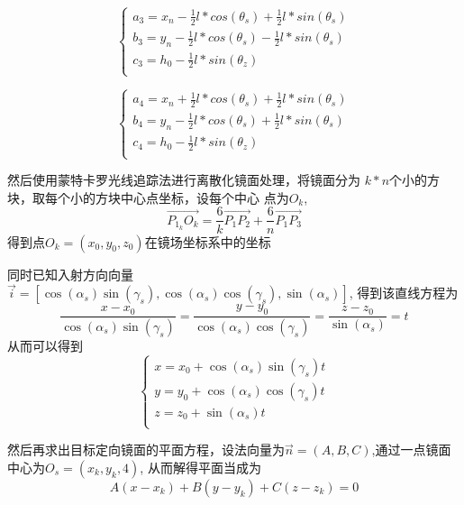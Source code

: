 \documentclass{数学建模}
\begin{document}
\begin{equation}
    \begin{cases}
        a_3 = x_n - \frac{1}{2}l*cos(\theta_s) +  \frac{1}{2}l*sin(\theta_s) \\
        b_3 = y_n - \frac{1}{2}l*cos(\theta_s) -  \frac{1}{2}l*sin(\theta_s) \\
        c_3 = h_0 - \frac{1}{2}l*sin(\theta_z)  \\
    \end{cases}
\end{equation}

\begin{equation}
    \begin{cases}
        a_4 = x_n + \frac{1}{2}l*cos(\theta_s) +  \frac{1}{2}l*sin(\theta_s) \\
        b_4 = y_n - \frac{1}{2}l*cos(\theta_s) +  \frac{1}{2}l*sin(\theta_s) \\
        c_4 = h_0 - \frac{1}{2}l*sin(\theta_z)  \\
    \end{cases}
\end{equation}

然后使用蒙特卡罗光线追踪法进行离散化镜面处理，将镜面分为
$k*n$个小的方块，取每个小的方块中心点坐标，设每个中心
点为$O_k$,
\begin{equation}
    \overrightarrow{P_{1_k}O_k} = \frac{6}{k} \overrightarrow{P_{1}P_{2}} + \frac{6}{n} \overrightarrow{P_{1}P_{3}}
\end{equation}
得到点$O_k=(x_0,y_0,z_0)$在镜场坐标系中的坐标

同时已知入射方向向量$\vec{i} = [ \cos (\alpha_s) \sin (\gamma_s),  \cos (\alpha_s) \cos (\gamma_s),  \sin (\alpha_s)]$,
得到该直线方程为
\begin{equation}
    \frac{x-x_0}{\cos (\alpha_s) \sin (\gamma_s)} = \frac{y-y_0}{\cos (\alpha_s) \cos (\gamma_s)} = \frac{z-z_0}{\sin (\alpha_s)} = t
\end{equation}
从而可以得到
\begin{equation}
    \begin{cases}
        x = x_0 + \cos (\alpha_s) \sin (\gamma_s) t \\
        y = y_0 + \cos (\alpha_s) \cos (\gamma_s) t \\
        z = z_0 + \sin (\alpha_s) t  \\
    \end{cases}
\end{equation}

然后再求出目标定向镜面的平面方程，设法向量为$\overrightarrow{n} = (A,B,C) $,通过一点镜面中心为$O_s = (x_k,y_k,4)$,
从而解得平面当成为
\begin{equation}
    A(x-x_k)+B(y-y_k)+C(z-z_k)=0
\end{equation}
\end{document}
